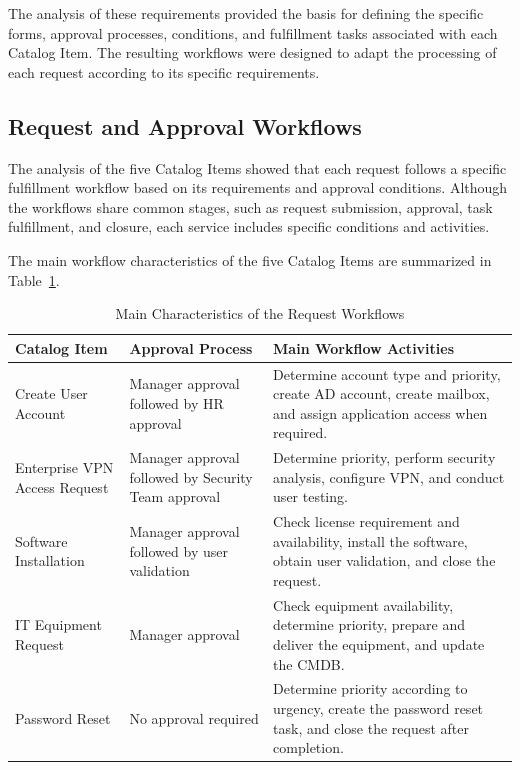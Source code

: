 \documentclass[12pt,a4paper]{report}
\begin{document}
The analysis of these requirements provided the basis for defining the
specific forms, approval processes, conditions, and fulfillment tasks
associated with each Catalog Item. The resulting workflows were designed to
adapt the processing of each request according to its specific requirements.

\subsection{Request and Approval Workflows}

The analysis of the five Catalog Items showed that each request follows a
specific fulfillment workflow based on its requirements and approval
conditions. Although the workflows share common stages, such as request
submission, approval, task fulfillment, and closure, each service includes
specific conditions and activities.

The main workflow characteristics of the five Catalog Items are summarized in
Table~\ref{tab:request-workflows}.

\begin{table}[H]
    \centering
    \renewcommand{\arraystretch}{1.3}
    \begin{tabularx}{\textwidth}{|
        >{\raggedright\arraybackslash}p{3.2cm}|
        >{\raggedright\arraybackslash}p{3.4cm}|
        X|}
        \hline
        \textbf{Catalog Item} &
        \textbf{Approval Process} &
        \textbf{Main Workflow Activities} \\
        \hline

        Create User Account &
        Manager approval followed by HR approval &
        Determine account type and priority, create AD account,
        create mailbox, and assign application access when required. \\
        \hline

        Enterprise VPN Access Request &
        Manager approval followed by Security Team approval &
        Determine priority, perform security analysis, configure VPN,
        and conduct user testing. \\
        \hline

        Software Installation &
        Manager approval followed by user validation &
        Check license requirement and availability, install the software,
        obtain user validation, and close the request. \\
        \hline

        IT Equipment Request &
        Manager approval &
        Check equipment availability, determine priority, prepare and
        deliver the equipment, and update the CMDB. \\
        \hline

        Password Reset &
        No approval required &
        Determine priority according to urgency, create the password
        reset task, and close the request after completion. \\
        \hline

    \end{tabularx}
    \caption{Main Characteristics of the Request Workflows}
    \label{tab:request-workflows}
\end{table}
\end{document}

